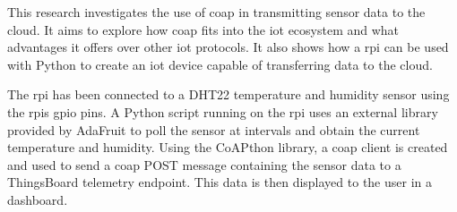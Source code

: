 This research investigates the use of \gls{coap} in transmitting sensor data
to the cloud. It aims to explore how \gls{coap} fits into the \gls{iot} ecosystem and
what advantages it offers over other \gls{iot} protocols. It also shows how a \gls{rpi} can
be used with Python to create an \gls{iot} device capable of transferring data to the cloud. 

The \gls{rpi} has been connected to a DHT22 temperature and humidity sensor using
the \glspl{rpi} \gls{gpio} pins. A Python script running on the \gls{rpi} uses
an external library provided by AdaFruit to poll the sensor at intervals and 
obtain the current temperature and humidity. Using the CoAPthon \citep{tanganelli_coapthon:_2015} 
library, a \gls{coap} client is created and used to send a \gls{coap} POST 
message containing the sensor data to a ThingsBoard 
\citep{thingsboard_inc._thingsboard_2018} telemetry endpoint. This data 
is then displayed to the user in a dashboard.

